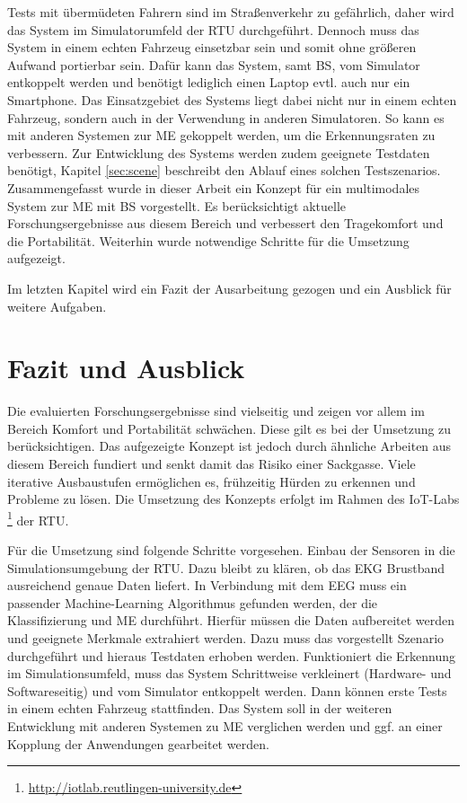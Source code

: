 {Tests mit übermüdeten Fahrern sind im Straßenverkehr zu gefährlich, daher wird das System im Simulatorumfeld der \acl{RTU} durchgeführt. Dennoch muss das System in einem echten Fahrzeug einsetzbar sein und somit ohne größeren Aufwand portierbar sein. Dafür kann das System, samt \acl{BS}, vom Simulator entkoppelt werden und benötigt lediglich einen Laptop evtl. auch nur ein Smartphone. Das Einsatzgebiet des Systems liegt dabei nicht nur in einem echten Fahrzeug, sondern auch in der Verwendung in anderen Simulatoren. So kann es mit anderen Systemen zur \acl{ME} gekoppelt werden, um die Erkennungsraten zu verbessern.
Zur Entwicklung des Systems werden zudem geeignete Testdaten benötigt, Kapitel \ref{sec:scene} beschreibt den Ablauf eines solchen Testszenarios. \\

Zusammengefasst wurde in dieser Arbeit ein Konzept für ein multimodales System zur  \acl{ME} mit \acl{BS} vorgestellt. Es berücksichtigt aktuelle Forschungsergebnisse aus diesem Bereich und verbessert den Tragekomfort und die Portabilität. Weiterhin wurde notwendige Schritte für die Umsetzung aufgezeigt.

Im letzten Kapitel wird ein Fazit der Ausarbeitung gezogen und ein Ausblick für weitere Aufgaben.

\section{Fazit und Ausblick}
\label{chap:outro}
Die evaluierten Forschungsergebnisse sind vielseitig und zeigen vor allem im Bereich Komfort und Portabilität schwächen. Diese gilt es bei der Umsetzung zu berücksichtigen. Das aufgezeigte Konzept ist jedoch durch ähnliche Arbeiten aus diesem Bereich fundiert und senkt damit das Risiko einer Sackgasse. Viele iterative Ausbaustufen ermöglichen es, frühzeitig Hürden zu erkennen und Probleme zu lösen. Die Umsetzung des Konzepts erfolgt im Rahmen des IoT-Labs \footnote{\url{http://iotlab.reutlingen-university.de}} der \acl{RTU}.

Für die Umsetzung sind folgende Schritte vorgesehen. Einbau der Sensoren in die Simulationsumgebung der \acl{RTU}. Dazu bleibt zu klären, ob das EKG Brustband ausreichend genaue Daten liefert. In Verbindung mit dem EEG muss ein passender Machine-Learning Algorithmus gefunden werden, der die Klassifizierung und \acl{ME} durchführt. Hierfür müssen die Daten aufbereitet werden und geeignete Merkmale extrahiert werden. Dazu muss das vorgestellt Szenario durchgeführt und hieraus Testdaten erhoben werden. Funktioniert die Erkennung im Simulationsumfeld, muss das System Schrittweise verkleinert (Hardware- und Softwareseitig) und vom Simulator entkoppelt werden. Dann können erste Tests in einem echten Fahrzeug stattfinden. Das System soll in der weiteren Entwicklung mit anderen Systemen zu \acl{ME} verglichen werden und ggf. an einer Kopplung der Anwendungen gearbeitet werden.\\

}
